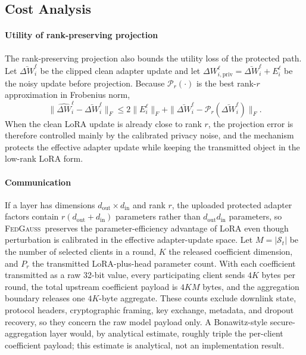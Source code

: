 \documentclass[a4paper,fleqn]{cas-dc}
\newcommand{\method}{\textsc{FedGauss}}
\begin{document}
\subsection{Cost Analysis}
\label{subsec:cost}
\par
\paragraph{Utility of rank-preserving projection}
The rank-preserving projection also bounds the utility loss of the protected
path. Let $\bar{\Delta W}_i^\ell$ be the clipped
clean adapter update and let $\Delta W_{i,\mathrm{priv}}^\ell =
\bar{\Delta W}_i^\ell + E_i^\ell$ be the noisy update before projection.
Because $\mathcal{P}_r(\cdot)$ is the best rank-$r$ approximation in
Frobenius norm,
\begin{equation}
\|\widehat{\Delta W}_i^\ell-\bar{\Delta W}_i^\ell\|_F
\leq
2\|E_i^\ell\|_F+
\|\bar{\Delta W}_i^\ell-\mathcal{P}_r(\bar{\Delta W}_i^\ell)\|_F .
\end{equation}
When the clean LoRA update is already close to rank $r$, the projection
error is therefore controlled mainly by the calibrated privacy noise, and
the mechanism protects the effective adapter update while keeping the
transmitted object in the low-rank LoRA form.
\par
\paragraph{Communication}
If a layer has dimensions $d_{\mathrm{out}}\times d_{\mathrm{in}}$ and rank
$r$, the uploaded protected adapter factors contain
$r(d_{\mathrm{out}}+d_{\mathrm{in}})$ parameters rather than
$d_{\mathrm{out}}d_{\mathrm{in}}$ parameters, so \method\ preserves the
parameter-efficiency advantage of LoRA even though perturbation is
calibrated in the effective adapter-update space. Let $M=|\mathcal{S}_t|$ be
the number of selected clients in a round, $K$ the released coefficient
dimension, and $P_r$ the transmitted LoRA-plus-head parameter count. With
each coefficient transmitted as a raw 32-bit value, every participating
client sends $4K$ bytes per round, the total upstream coefficient payload is
$4KM$ bytes, and the aggregation boundary releases one $4K$-byte aggregate.
These counts exclude downlink state, protocol headers, cryptographic
framing, key exchange, metadata, and dropout recovery, so they concern the
raw model payload only. A Bonawitz-style secure-aggregation layer would, by
analytical estimate, roughly triple the per-client coefficient payload;
this estimate is analytical, not an implementation result.
\par
\end{document}
